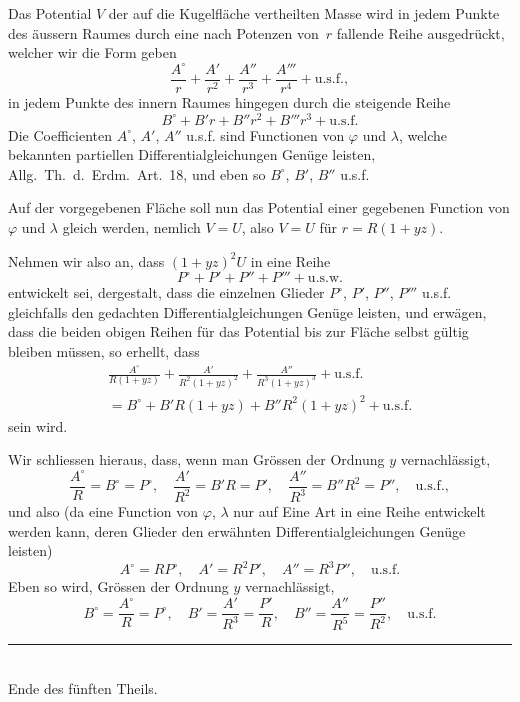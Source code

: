\documentclass[12pt,a4paper]{article}
\begin{document}
\section{}
Das Potential $V$ der auf die Kugelfläche vertheilten Masse wird in jedem
Punkte des äussern Raumes durch eine nach Potenzen von~$r$ fallende Reihe ausgedrückt,
welcher wir die Form geben
\[
\frac{A^{\circ}}{r}+\frac{A'}{r^2}+\frac{A''}{r^3}+\frac{A'''}{r^4}+\text{u.s.f.},
\]
in jedem Punkte des innern Raumes hingegen durch die steigende Reihe
\[
B^{\circ}+B'r+B''r^2+B'''r^3+\text{u.s.f.}
\]
Die Coefficienten $A^{\circ}$, $A'$, $A''$ u.s.f. sind Functionen von $\varphi$ und $\lambda$, welche bekannten
partiellen Differentialgleichungen Genüge leisten, Allg.\ Th.\ d.\ Erdm.\ Art.~18,
und eben so $B^{\circ}$, $B'$, $B''$ u.s.f.

Auf der vorgegebenen Fläche soll nun das Potential einer gegebenen Function
von $\varphi$ und $\lambda$ gleich werden, nemlich $V=U$, also $V=U$ für $r=R(1+yz)$.

Nehmen wir also an, dass $(1+yz)^2 U$ in eine Reihe
\[
P^{\circ}+P'+P''+P'''+\text{u.s.w.}
\]
entwickelt sei, dergestalt, dass die einzelnen Glieder $P^{\circ}$, $P'$, $P''$, $P'''$ u.s.f.
gleichfalls den gedachten Differentialgleichungen Genüge leisten, und erwägen,
dass die beiden obigen Reihen für das Potential bis zur Fläche selbst gültig bleiben
müssen, so erhellt, dass
\begin{align*}
\frac{A^{\circ}}{R(1+yz)}+\frac{A'}{R^2(1+yz)^2}+\frac{A''}{R^3(1+yz)^3}+\text{u.s.f.}\\
= B^{\circ}+B'R(1+yz)+B''R^2(1+yz)^2+\text{u.s.f.}
\end{align*}
sein wird.

Wir schliessen hieraus, dass, wenn man Grössen der Ordnung $y$ vernachlässigt,
\[
\frac{A^{\circ}}{R}=B^{\circ}=P^{\circ},\quad
\frac{A'}{R^2}=B'R=P',\quad
\frac{A''}{R^3}=B''R^2=P'',\quad\text{u.s.f.},
\]
und also (da eine Function von $\varphi$, $\lambda$ nur auf Eine Art in eine Reihe entwickelt
werden kann, deren Glieder den erwähnten Differentialgleichungen Genüge leisten)
\[
A^{\circ}=RP^{\circ},\quad A'=R^2P',\quad A''=R^3P'',\quad\text{u.s.f.}
\]
Eben so wird, Grössen der Ordnung $y$ vernachlässigt,
\[
B^{\circ}=\frac{A^{\circ}}{R}=P^{\circ},\quad
B'=\frac{A'}{R^3}=\frac{P'}{R},\quad
B''=\frac{A''}{R^5}=\frac{P''}{R^2},\quad\text{u.s.f.}
\]

\vfill
\begin{center}
\rule{0.5\textwidth}{0.4pt}\\[0.3cm]
{\small Ende des fünften Theils.}
\end{center}
\end{document}
